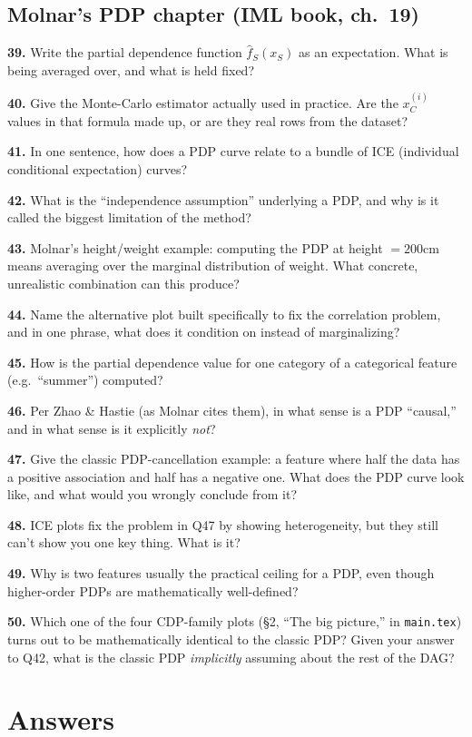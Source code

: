 \documentclass[11pt]{article}
\newcommand{\qa}[2]{\par\noindent\textbf{#1.} #2\par\smallskip}
\begin{document}
\subsection*{Molnar's PDP chapter (IML book, ch.\ 19)}
\qa{39}{Write the partial dependence function $\hat f_S(x_S)$ as an
  expectation. What is being averaged over, and what is held fixed?}
\qa{40}{Give the Monte-Carlo estimator actually used in practice. Are the
  $x_C^{(i)}$ values in that formula made up, or are they real rows from the
  dataset?}
\qa{41}{In one sentence, how does a PDP curve relate to a bundle of ICE
  (individual conditional expectation) curves?}
\qa{42}{What is the ``independence assumption'' underlying a PDP, and why is
  it called the biggest limitation of the method?}
\qa{43}{Molnar's height/weight example: computing the PDP at height
  $=200$cm means averaging over the marginal distribution of weight. What
  concrete, unrealistic combination can this produce?}
\qa{44}{Name the alternative plot built specifically to fix the
  correlation problem, and in one phrase, what does it condition on instead
  of marginalizing?}
\qa{45}{How is the partial dependence value for one category of a
  categorical feature (e.g.\ ``summer'') computed?}
\qa{46}{Per Zhao \& Hastie (as Molnar cites them), in what sense is a PDP
  ``causal,'' and in what sense is it explicitly \emph{not}?}
\qa{47}{Give the classic PDP-cancellation example: a feature where half the
  data has a positive association and half has a negative one. What does
  the PDP curve look like, and what would you wrongly conclude from it?}
\qa{48}{ICE plots fix the problem in Q47 by showing heterogeneity, but they
  still can't show you one key thing. What is it?}
\qa{49}{Why is two features usually the practical ceiling for a PDP, even
  though higher-order PDPs are mathematically well-defined?}
\qa{50}{Which one of the four CDP-family plots (\S2, ``The big picture,''
  in \texttt{main.tex}) turns out to be mathematically identical to the
  classic PDP? Given your answer to Q42, what is the classic PDP
  \emph{implicitly} assuming about the rest of the DAG?}

\clearpage
\section*{Answers}
\end{document}

